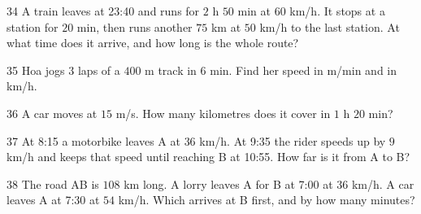 \gap
\begin{probbox}{34}{}
A train leaves at 23:40 and runs for $2$ h $50$ min at $60$ km/h. It stops at a station for $20$ min, then runs another $75$ km at $50$ km/h to the last station. At what time does it arrive, and how long is the whole route?
\end{probbox}
\gap
\begin{probbox}{35}{}
Hoa jogs $3$ laps of a $400$ m track in $6$ min. Find her speed in m/min and in km/h.
\end{probbox}
\gap
\begin{probbox}{36}{}
A car moves at $15$ m/s. How many kilometres does it cover in $1$ h $20$ min?
\end{probbox}
\gap
\begin{probbox}{37}{}
At 8:15 a motorbike leaves A at $36$ km/h. At 9:35 the rider speeds up by $9$ km/h and keeps that speed until reaching B at 10:55. How far is it from A to B?
\end{probbox}
\gap
\begin{probbox}{38}{}
The road AB is $108$ km long. A lorry leaves A for B at 7:00 at $36$ km/h. A car leaves A at 7:30 at $54$ km/h. Which arrives at B first, and by how many minutes?
\end{probbox}
